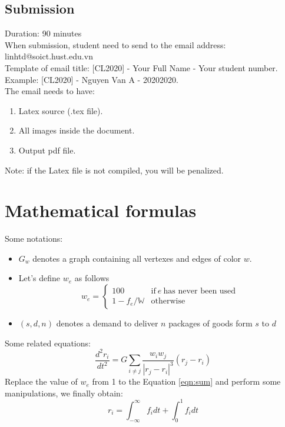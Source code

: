 \documentclass[a4paper,10pt,twocolumn]{article}
\begin{document}
\subsection{Submission}
Duration: 90 minutes\\
When submission, student need to send to the email address: linhtd@soict.hust.edu.vn\\
Template of email title: [CL2020] - Your Full Name - Your student number.\\
Example: [CL2020] - Nguyen Van A - 20202020.\\
The email needs to have:
\begin{enumerate}
\item Latex source (.tex file).
\item All images inside the document.
\item Output pdf file.
\end{enumerate}
Note: if the Latex file is not compiled, you will be penalized.

\section{Mathematical formulas}
Some notations:
\begin{itemize}
\item $G_w$ denotes a graph containing all vertexes and edges of color $w$.
\item Let's define $w_e$ as follows
\begin{equation}
w_e =
\left\lbrace
\begin{array}{ll}
	100 & \text{if} \ e \  \text{has never been used}\\
	1- f_e/\mathbb{W} & \text{otherwise}
\end{array}
\right.
\end{equation}
\item $(s, d, n)$ denotes a demand to deliver $n$ packages of goods form $s$ to $d$
\end{itemize}
Some related equations:
\begin{equation}
\frac{d^2r_i}{dt^2}= G\sum_{i \neq j} \frac{w_iw_j}{|r_j - r_i|^3}(r_j - r_i)
\label{eqn:sum}
\end{equation}
Replace the value of $w_e$ from 1 to the Equation \ref{eqn:sum} and perform some manipulations, we finally obtain:
\begin{equation}
r_i = \int_{-\infty}^{\infty}f_idt + \int_0^1 f_idt
\end{equation}
\end{document}
